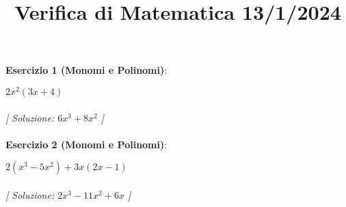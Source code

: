 \documentclass{article}
\title{\raggedright Verifica di Matematica  13/1/2024}
\date{}
\begin{document}
\maketitle

\textbf{Esercizio 1 (Monomi e Polinomi)}:\\
\par $2x^2(3x + 4)$ \\\\

\textit{[ Soluzione: $6x^3 + 8x^2$ ]}\\\\

\textbf{Esercizio 2 (Monomi e Polinomi)}:\\
\par $2(x^3 - 5x^2) + 3x(2x - 1)$ \\\\

\textit{[ Soluzione: $2x^3 - 11x^2 + 6x$ ]}\\\\
\end{document}

